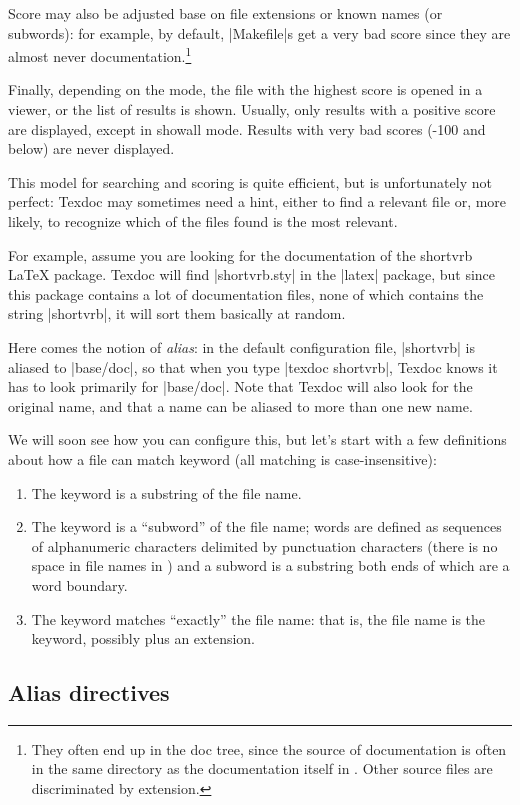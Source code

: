 \documentclass[draft]{texdoc-doc}
\begin{document}
Score may also be adjusted base on file extensions or known names (or
subwords): for example, by default, |Makefile|s get a very bad score since they
are almost never documentation.\footnote{They often end up in the doc tree,
since the source of documentation is often in the same directory as the
documentation itself in {\TL}. Other source files are discriminated by
extension.}

Finally, depending on the mode, the file with the highest score is opened in a
viewer, or the list of results is shown. Usually, only results with a positive
score are displayed, except in showall mode. Results with very bad scores
(-100 and below) are never displayed.

This model for searching and scoring is quite efficient, but is unfortunately
not perfect: Texdoc may sometimes need a hint, either to find a relevant file
or, more likely, to recognize which of the files found is the most relevant.

For example, assume you are looking for the documentation of the shortvrb
{\LaTeX} package. Texdoc will find |shortvrb.sty| in the |latex| {\TL}
package, but since this package contains a lot of documentation files, none of
which contains the string |shortvrb|, it will sort them basically at random.

Here comes the notion of \emph{alias}: in the default configuration file,
|shortvrb| is aliased to |base/doc|, so that when you type |texdoc shortvrb|,
Texdoc knows it has to look primarily for |base/doc|. Note that Texdoc will
also look for the original name, and that a name can be aliased to more than
one new name.

We will soon see how you can configure this, but let's start with a few
definitions about how a file can match keyword (all matching is
case-insensitive):
%
\begin{enumerate}
\item The keyword is a substring of the file name.
\item The keyword is a ``subword'' of the file name; words are defined as
  sequences of alphanumeric characters delimited by punctuation characters
  (there is no space in file names in {\TL}) and a subword is a
  substring both ends of which are a word boundary.
\item The keyword matches ``exactly'' the file name: that is, the file
  name is the keyword, possibly plus an extension.
\end{enumerate}

\subsection{Alias directives}
\label{sec:alias}
\end{document}
